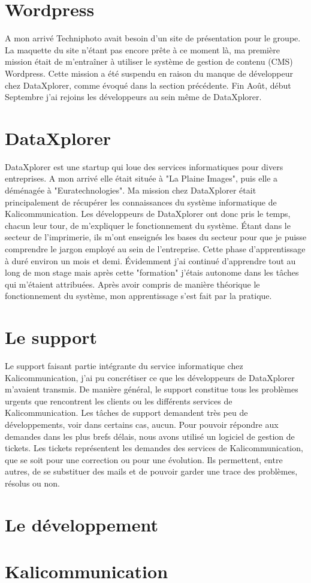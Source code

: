 
\section{Wordpress}
A mon arrivé Techniphoto avait besoin d'un site de présentation pour le groupe. La maquette du site n'étant pas encore prête à ce moment là, ma première mission était de m'entraîner à utiliser le système de gestion de contenu (CMS) Wordpress. Cette mission a été suspendu en raison du manque de développeur chez DataXplorer, comme évoqué dans la section précédente. Fin Août, début Septembre j'ai rejoins les développeurs au sein même de DataXplorer.

\section{DataXplorer}
DataXplorer est une startup qui loue des services informatiques pour divers entreprises. A mon arrivé elle était située à "La Plaine Images", puis elle a déménagée à "Euratechnologies". Ma mission chez DataXplorer était principalement de récupérer les connaissances du système informatique de Kalicommunication. Les développeurs de DataXplorer ont donc pris le temps, chacun leur tour, de m'expliquer le fonctionnement du système. Étant dans le secteur de l'imprimerie, ils m'ont enseignés les bases du secteur pour que je puisse comprendre le jargon employé au sein de l'entreprise. Cette phase d'apprentissage à duré environ un mois et demi. Évidemment j'ai continué d'apprendre tout au long de mon stage mais après cette "formation" j'étais autonome dans les tâches qui m'étaient attribuées.\newline
Après avoir compris de manière théorique le fonctionnement du système, mon apprentissage s'est fait par la pratique.
\section{Le support}
Le support faisant partie intégrante du service informatique chez Kalicommunication, j'ai pu concrétiser ce que les développeurs de DataXplorer m'avaient transmis. De manière général, le support constitue tous les problèmes urgents que rencontrent les clients ou les différents services de Kalicommunication. Les tâches de support demandent très peu de développements, voir dans certains cas, aucun.\newline
Pour pouvoir répondre aux demandes dans les plus brefs délais, nous avons utilisé un logiciel de gestion de tickets. Les tickets représentent les demandes des services de Kalicommunication, que se soit pour une correction ou pour une évolution. Ils permettent, entre autres, de se substituer des mails et de pouvoir garder une trace des problèmes, résolus ou non.\newline

\section{Le développement}
\section{Kalicommunication}
